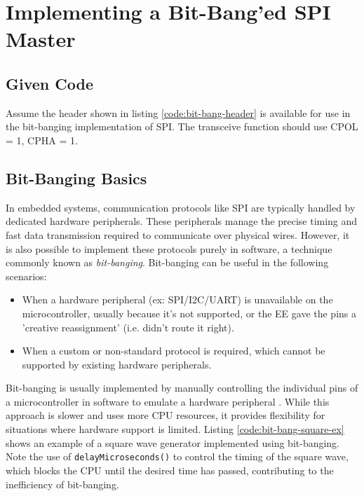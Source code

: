 \documentclass[main.tex]{subfiles}
\begin{document}
\section{Implementing a Bit-Bang'ed SPI Master}

\subsection{Given Code}
Assume the header shown in listing \ref{code:bit-bang-header} is available for use in the bit-banging implementation of SPI. The transceive function should use CPOL = 1, CPHA = 1. 



\spoilerline


\subsection{Bit-Banging Basics}
In embedded systems, communication protocols like SPI are typically handled by dedicated hardware peripherals. These peripherals manage the precise timing and fast data transmission required to communicate over physical wires. However, it is also possible to implement these protocols purely in software, a technique commonly known as \textit{bit-banging}. Bit-banging can be useful in the following scenarios:
\begin{itemize}
    \item When a hardware peripheral (ex: SPI/I2C/UART) is unavailable on the microcontroller, usually because it's not supported, or the EE gave the pins a 'creative reassignment' (i.e. didn't route it right).
    \item When a custom or non-standard protocol is required, which cannot be supported by existing hardware peripherals.
\end{itemize}

\noindent Bit-banging is usually implemented by manually controlling the individual pins of a microcontroller in software to emulate a hardware peripheral \cite{looi_bitbanging}. While this approach is slower and uses more CPU resources, it provides flexibility for situations where hardware support is limited. Listing \ref{code:bit-bang-square-ex} shows an example of a square wave generator implemented using bit-banging. Note the use of \texttt{delayMicroseconds()} to control the timing of the square wave, which blocks the CPU until the desired time has passed, contributing to the inefficiency of bit-banging.
\end{document}
